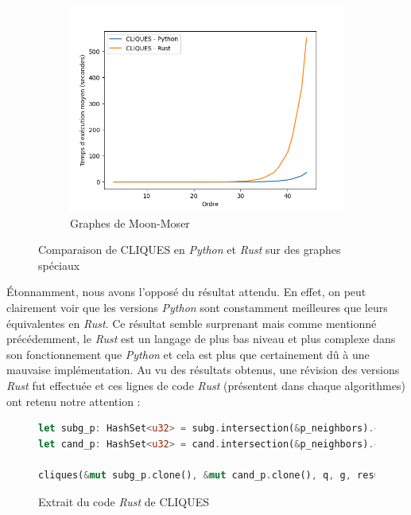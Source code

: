 \documentclass[12pt,a4paper]{article}
\begin{document}
\begin{figure}[ht]
\begin{subfigure}[b]{0.32\textwidth}
    \includegraphics[width=\textwidth]{images/total_CLIQUES_pyrust_pivot_turan_plot.png}
  \caption{Graphes de Moon-Moser}%
  \label{subfig:pr_cliques_turan}
  \end{subfigure}
  \caption{Comparaison de CLIQUES en \emph{Python} et \emph{Rust} sur des graphes spéciaux}%
  \label{fig:pvr_cliques}
\end{figure}

Étonnamment, nous avons l'opposé du résultat attendu. En effet, on peut clairement voir que les versions \emph{Python} sont constamment meilleures que leurs équivalentes en \emph{Rust}. Ce résultat semble surprenant mais comme mentionné précédemment, le \emph{Rust} est un langage de plus bas niveau et plus complexe dans son fonctionnement que \emph{Python} et cela est plus que certainement dû à une mauvaise implémentation. Au vu des résultats obtenus, une révision des versions \emph{Rust} fut effectuée et ces lignes de code \emph{Rust} (présentent dans chaque algorithmes) ont retenu notre attention :

\begin{figure}[ht]
  \begin{lstlisting}[language=Rust]
let subg_p: HashSet<u32> = subg.intersection(&p_neighbors).cloned().collect();
let cand_p: HashSet<u32> = cand.intersection(&p_neighbors).cloned().collect();

cliques(&mut subg_p.clone(), &mut cand_p.clone(), q, g, result, delay);
  \end{lstlisting}
  \caption{Extrait du code \emph{Rust} de CLIQUES}
  \label{fig:bad_rust}
\end{figure}
\end{document}
